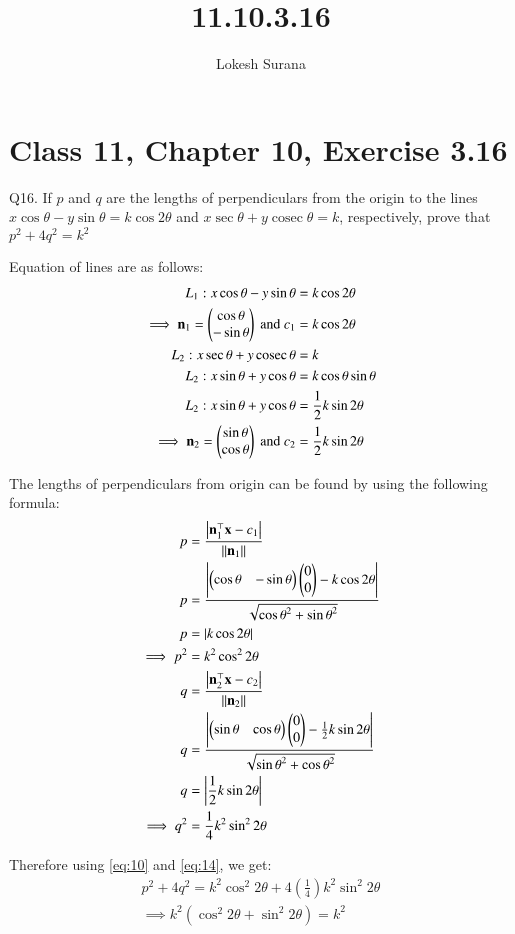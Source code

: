 \documentclass[journal,12pt,twocolumn]{IEEEtran}
\renewcommand{\vec}[1]{\boldsymbol{\mathbf{#1}}}
\begin{document}
\newcommand{\cosec}{\mathop{\mathrm{cosec}}}

\vspace{3cm}
\title{11.10.3.16}
\author{Lokesh Surana}
\maketitle
\section*{Class 11, Chapter 10, Exercise 3.16}

Q16. If ${p}$ and ${q}$ are the lengths of perpendiculars from the origin to the lines ${x}\cos\theta - {y}\sin\theta =  {k}\cos2\theta$ and ${x}\sec\theta + {y}\cosec\theta = {k}$, respectively, prove that ${p}^2 + 4{q}^2 = {k}^2$

\solution Equation of lines are as follows:
\begin{align}
    \label{eq:1} {L}_1: {x}\cos\theta - {y}\sin\theta &=  {k}\cos2\theta \\
    \label{eq:2} \implies \vec{n}_1 = \myvec{\cos\theta \\ -\sin\theta} \text{ and } {c}_1 &= {k}\cos2\theta\\
    \label{eq:3} {L}_2: {x}\sec\theta + {y}\cosec\theta &= {k} \\
    \label{eq:4} {L}_2: {x}\sin\theta + {y}\cos\theta &= {k}\cos\theta\sin\theta \\
    \label{eq:5} {L}_2: {x}\sin\theta + {y}\cos\theta &= \frac{1}{2}{k}\sin2\theta \\
    \label{eq:6} \implies \vec{n}_2 = \myvec{\sin\theta \\ \cos\theta} \text{ and } {c}_2 &= \frac{1}{2}{k}\sin2\theta
\end{align}

The lengths of perpendiculars from origin can be found by using the following formula:
\begin{align}
    \label{eq:7} {p} &= \frac{\abs{  \vec{n}_1^{\top}\vec{x}-{c}_1 }}{\norm{\vec{n}_1}} \\
    \label{eq:8} {p} &= \frac{\abs{ \myvec{\cos\theta & -\sin\theta}\myvec{0\\0} - {k}\cos2\theta}}{\sqrt{{\cos\theta}^2 + {\sin\theta}^2}} \\
    \label{eq:9} {p} &= \abs{{k}\cos2\theta} \\
    \label{eq:10} \implies {p}^2 &= {k}^2\cos^2 2\theta\\
    \label{eq:11} {q} &= \frac{\abs{  \vec{n}_2^{\top}\vec{x}-{c}_2 }}{\norm{\vec{n}_2}} \\
    \label{eq:12} {q} &= \frac{\abs{ \myvec{\sin\theta & \cos\theta}\myvec{0\\0} - \frac{1}{2}{k}\sin2\theta}}{\sqrt{{\sin\theta}^2 + {\cos\theta}^2}} \\
    \label{eq:13} {q} &= \abs{ \frac{1}{2}{k}\sin2\theta}\\
    \label{eq:14} \implies {q}^2 &= \frac{1}{4}{k}^2\sin^2 2\theta
\end{align}

Therefore using \eqref{eq:10} and \eqref{eq:14}, we get:
\begin{align}
    {p}^2 + 4{q}^2 = {k}^2\cos^2 2\theta + 4(\frac{1}{4}){k}^2\sin^2 2\theta \\
    \implies {k}^2(\cos^2 2\theta + \sin^2 2\theta) = {k}^2
\end{align}
\end{document}
